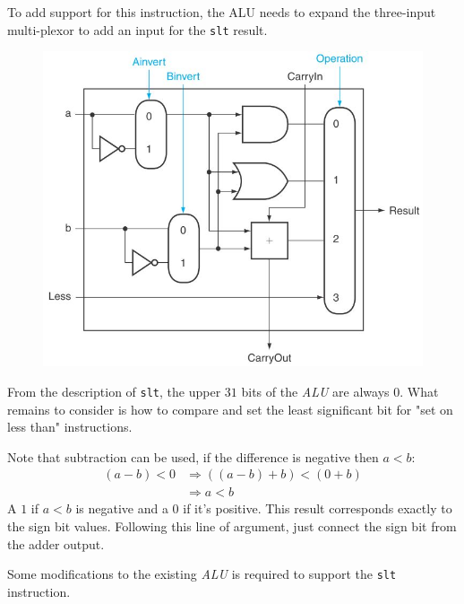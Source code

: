 \documentclass[10pt,a4paper]{article}
\begin{document}
To add support for this instruction, the ALU needs to expand the three-input multi-plexor to add an input for the \texttt{slt} result. 
\begin{figure} [h!]
    \centering
    \includegraphics[scale=0.6]{slt.JPG}
\end{figure}

From the description of \texttt{slt}, the upper $31$ bits of the \textit{ALU} are always $0$. What
remains to consider is how to compare and set the least significant bit for "set on less than"
instructions.

Note that subtraction can be used, if the difference is negative then $a < b$:
\begin{align*}
    (a-b) < 0 &\Rightarrow ((a-b)+b)<(0+b) \\
    &\Rightarrow a<b
\end{align*} 
A $1$ if $a < b$ is negative and a $0$ if it’s positive. This result corresponds exactly to the sign
bit values. Following this line of argument, just connect the sign bit from the adder output.

Some modifications to the existing \textit{ALU} is required to support the \texttt{slt} instruction.
\end{document}
